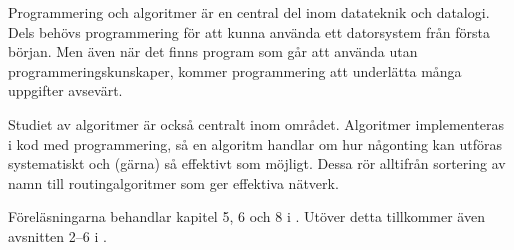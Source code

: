 Programmering och algoritmer är en central del inom datateknik och datalogi.
Dels behövs programmering för att kunna använda ett datorsystem från första 
början.
Men även när det finns program som går att använda utan 
programmeringskunskaper, kommer programmering att underlätta många uppgifter 
avsevärt.

Studiet av algoritmer är också centralt inom området.
Algoritmer implementeras i kod med programmering, så en algoritm handlar om hur 
någonting kan utföras systematiskt och (gärna) så effektivt som möjligt.
Dessa rör alltifrån sortering av namn till routingalgoritmer som ger effektiva 
nätverk.

Föreläsningarna behandlar kapitel 5, 6 och 8 i  
\cite{Brookshear2012csa}.
Utöver detta tillkommer även avsnitten 2--6 i  
\cite{pythonkramaren1}.

